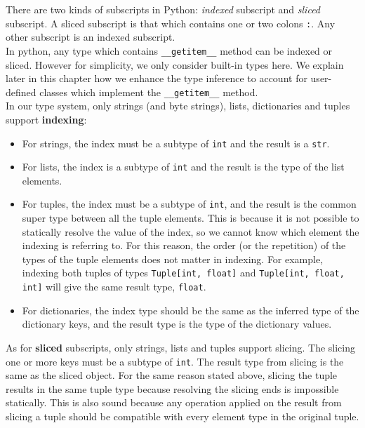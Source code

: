There are two kinds of subscripts in Python: \textit{indexed} subscript and \textit{sliced} subscript. A sliced subscript is that which contains one or two colons \lstinline|:|. Any other subscript is an indexed subscript. \\

In python, any type which contains \lstinline|__getitem__| method can be indexed or sliced. However for simplicity, we only consider built-in types here. We explain later in this chapter how we enhance the type inference to account for user-defined classes which implement the \lstinline|__getitem__| method. \\

In our type system, only strings (and byte strings), lists, dictionaries and tuples support \textbf{indexing}:

\begin{itemize}
	\item For strings, the index must be a subtype of \lstinline|int| and the result is a \lstinline|str|.
	\item For lists, the index is a subtype of \lstinline|int| and the result is the type of the list elements.
	\item For tuples, the index must be a subtype of \lstinline|int|, and the result is the common super type between all the tuple elements. This is because it is not possible to statically resolve the value of the index, so we cannot know which element the indexing is referring to. For this reason, the order (or the repetition) of the types of the tuple elements does not matter in indexing. For example, indexing both tuples of types \lstinline|Tuple[int, float]| and \lstinline|Tuple[int, float, int]| will give the same result type, \lstinline|float|.
	\item For dictionaries, the index type should be the same as the inferred type of the dictionary keys, and the result type is the type of the dictionary values.
\end{itemize}

As for \textbf{sliced} subscripts, only strings, lists and tuples support slicing. The slicing one or more keys must be a subtype of \lstinline|int|. The result type from slicing is the same as the sliced object. For the same reason stated above, slicing the tuple results in the same tuple type because resolving the slicing ends is impossible statically. This is also sound because any operation applied on the result from slicing a tuple should be compatible with every element type in the original tuple.

